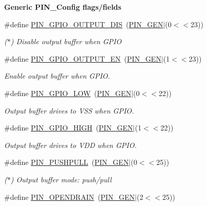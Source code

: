 \begin{Indent}{\bf Generic P\+I\+N\+\_\+\+Config flags/fields}
\begin{DoxyCompactItemize}
\#define \hyperlink{_p_i_n_8h_a8728d817e2f0f18c5fccce87e13d3c34}{P\+I\+N\+\_\+\+G\+P\+I\+O\+\_\+\+O\+U\+T\+P\+U\+T\+\_\+\+D\+I\+S}~(\hyperlink{_p_i_n_8h_ae1f7e47a17caab9697e69e5b9aff270b}{P\+I\+N\+\_\+\+G\+E\+N}$\vert$(0$<$$<$23))
\begin{DoxyCompactList}\small\item\em ($\ast$) Disable output buffer when G\+P\+I\+O \end{DoxyCompactList}\item 
\#define \hyperlink{_p_i_n_8h_a086fd19a419fb4b09f30ed993a3088c7}{P\+I\+N\+\_\+\+G\+P\+I\+O\+\_\+\+O\+U\+T\+P\+U\+T\+\_\+\+E\+N}~(\hyperlink{_p_i_n_8h_ae1f7e47a17caab9697e69e5b9aff270b}{P\+I\+N\+\_\+\+G\+E\+N}$\vert$(1$<$$<$23))
\begin{DoxyCompactList}\small\item\em Enable output buffer when G\+P\+I\+O. \end{DoxyCompactList}\item 
\#define \hyperlink{_p_i_n_8h_a269b0e2fe279666149ca1c5949bb32ca}{P\+I\+N\+\_\+\+G\+P\+I\+O\+\_\+\+L\+O\+W}~(\hyperlink{_p_i_n_8h_ae1f7e47a17caab9697e69e5b9aff270b}{P\+I\+N\+\_\+\+G\+E\+N}$\vert$(0$<$$<$22))
\begin{DoxyCompactList}\small\item\em Output buffer drives to V\+S\+S when G\+P\+I\+O. \end{DoxyCompactList}\item 
\#define \hyperlink{_p_i_n_8h_aee8e9896270f36a15df12fb85f2cb4ad}{P\+I\+N\+\_\+\+G\+P\+I\+O\+\_\+\+H\+I\+G\+H}~(\hyperlink{_p_i_n_8h_ae1f7e47a17caab9697e69e5b9aff270b}{P\+I\+N\+\_\+\+G\+E\+N}$\vert$(1$<$$<$22))
\begin{DoxyCompactList}\small\item\em Output buffer drives to V\+D\+D when G\+P\+I\+O. \end{DoxyCompactList}\item 
\#define \hyperlink{_p_i_n_8h_a8b219fa4a7727c4f5a7beb5134144324}{P\+I\+N\+\_\+\+P\+U\+S\+H\+P\+U\+L\+L}~(\hyperlink{_p_i_n_8h_ae1f7e47a17caab9697e69e5b9aff270b}{P\+I\+N\+\_\+\+G\+E\+N}$\vert$(0$<$$<$25))
\begin{DoxyCompactList}\small\item\em ($\ast$) Output buffer mode\+: push/pull \end{DoxyCompactList}\item 
\#define \hyperlink{_p_i_n_8h_a7d238d7776de5cc504dc37d62ac61295}{P\+I\+N\+\_\+\+O\+P\+E\+N\+D\+R\+A\+I\+N}~(\hyperlink{_p_i_n_8h_ae1f7e47a17caab9697e69e5b9aff270b}{P\+I\+N\+\_\+\+G\+E\+N}$\vert$(2$<$$<$25))

\end{DoxyCompactItemize}
\end{Indent}
